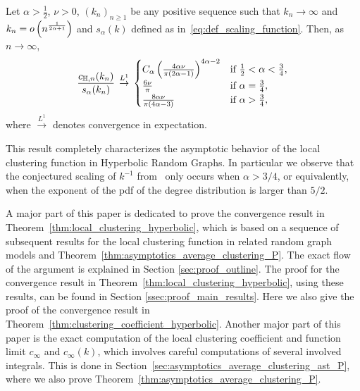 \begin{corollary}
\label{cor:asymptotic_local_clustering_hyperbolic}
Let $\alpha > \frac{1}{2}$, $\nu > 0$, $(k_n)_{n \ge 1}$ be any positive sequence such that $k_n \to \infty$ and $k_n = o\left(n^{\frac{1}{2\alpha + 1}}\right)$ and $s_\alpha(k)$ defined as in~\eqref{eq:def_scaling_function}. Then, as $n \to \infty$,
\[
	\frac{c_{\mathbb{H},n}(k_n)}{s_\alpha(k_n)} \, \stackrel{L^1}{\rightarrow} \, 
	\begin{cases}
				C_\alpha \left(\frac{4\alpha \nu}{\pi\left(2\alpha - 1\right)}\right)^{4\alpha - 2}
				&\mbox{if } \frac{1}{2} < \alpha < \frac{3}{4},\\
				\frac{6\nu}{\pi} &\mbox{if } \alpha = \frac{3}{4},\\
				\frac{8\alpha \nu}{\pi\left(4\alpha - 3\right)} &\mbox{if } \alpha > \frac{3}{4},
		\end{cases}
\]
where $\stackrel{L^1}{\to}$ denotes convergence in expectation.
\end{corollary}


This result completely  
characterizes the asymptotic behavior of the local clustering function in Hyperbolic Random Graphs. In particular we observe that the conjectured scaling of $k^{-1}$ from~\cite{krioukov2010hyperbolic} only occurs when $\alpha > 3/4$, or equivalently, when the exponent of the pdf of the degree distribution is larger than $5/2$. 

A major part of this paper is dedicated to prove the convergence result in Theorem~\ref{thm:local_clustering_hyperbolic}, which is based on a sequence of subsequent results for the local clustering function in related random graph models and Theorem~\ref{thm:asymptotics_average_clustering_P}. The exact flow of the argument is explained in Section \ref{sec:proof_outline}. The proof for the convergence result in Theorem~\ref{thm:local_clustering_hyperbolic}, using these results, can be found in Section \ref{ssec:proof_main_results}. Here we also give the proof of the convergence result in Theorem~\ref{thm:clustering_coefficient_hyperbolic}. Another major part of this paper is the exact computation of the local clustering coefficient and function limit $c_\infty$ and $c_\infty(k)$, which involves careful computations of several involved integrals. This is done in Section~\ref{sec:asymptotics_average_clustering_ast_P}, where we also prove Theorem~\ref{thm:asymptotics_average_clustering_P}.

